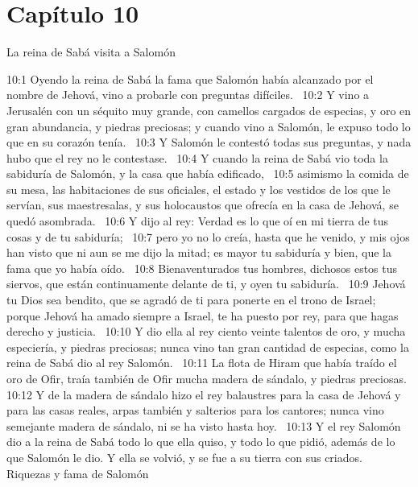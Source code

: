\section*{Capítulo 10}
La reina de Sabá visita a Salomón  


10:1 Oyendo la reina de Sabá la fama que Salomón había alcanzado por el nombre de Jehová, vino a probarle con preguntas difíciles.  
10:2 Y vino a Jerusalén con un séquito muy grande, con camellos cargados de especias, y oro en gran abundancia, y piedras preciosas; y cuando vino a Salomón, le expuso todo lo que en su corazón tenía.  
10:3 Y Salomón le contestó todas sus preguntas, y nada hubo que el rey no le contestase.  
10:4 Y cuando la reina de Sabá vio toda la sabiduría de Salomón, y la casa que había edificado,  
10:5 asimismo la comida de su mesa, las habitaciones de sus oficiales, el estado y los vestidos de los que le servían, sus maestresalas, y sus holocaustos que ofrecía en la casa de Jehová, se quedó asombrada.  
10:6 Y dijo al rey: Verdad es lo que oí en mi tierra de tus cosas y de tu sabiduría;  
10:7 pero yo no lo creía, hasta que he venido, y mis ojos han visto que ni aun se me dijo la mitad; es mayor tu sabiduría y bien, que la fama que yo había oído.  
10:8 Bienaventurados tus hombres, dichosos estos tus siervos, que están continuamente delante de ti, y oyen tu sabiduría.  
10:9 Jehová tu Dios sea bendito, que se agradó de ti para ponerte en el trono de Israel; porque Jehová ha amado siempre a Israel, te ha puesto por rey, para que hagas derecho y justicia.  
10:10 Y dio ella al rey ciento veinte talentos de oro, y mucha especiería, y piedras preciosas; nunca vino tan gran cantidad de especias, como la reina de Sabá dio al rey Salomón.  
10:11 La flota de Hiram que había traído el oro de Ofir, traía también de Ofir mucha madera de sándalo, y piedras preciosas.  
10:12 Y de la madera de sándalo hizo el rey balaustres para la casa de Jehová y para las casas reales, arpas también y salterios para los cantores; nunca vino semejante madera de sándalo, ni se ha visto hasta hoy.  
10:13 Y el rey Salomón dio a la reina de Sabá todo lo que ella quiso, y todo lo que pidió, además de lo que Salomón le dio. Y ella se volvió, y se fue a su tierra con sus criados.  
Riquezas y fama de Salomón  

